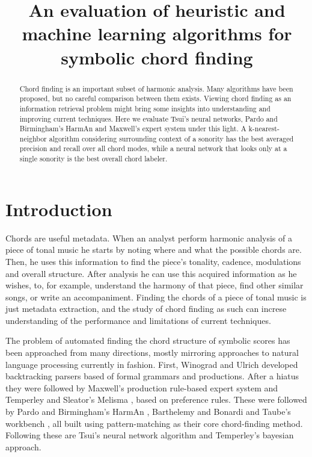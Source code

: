 \documentclass{article}
\title{An evaluation of heuristic and machine learning algorithms for
  symbolic chord finding} \oneauthor {}{}
\newcommand{\comment}[1]{}
\begin{document}
\graphicspath{{figs/}{data/}}
\maketitle

\begin{abstract}
Chord finding is an important subset of harmonic analysis. Many
algorithms have been proposed, but no careful comparison between them
exists. Viewing chord finding as an information retrieval problem
might bring some insights into understanding and improving current
techniques. Here we evaluate Tsui's neural networks, Pardo and
Birmingham's HarmAn and Maxwell's expert system under this light. A
k-nearest-neighbor algorithm considering surrounding context of a
sonority has the best averaged precision and recall over all chord
modes, while a neural network that looks only at a single sonority
is the best overall chord labeler.
\end{abstract}

\section{Introduction}
\label{sec:introduction}

\comment{
  ==> chord finding é importante, vários algoritmos propostos, poucas
  comparações 
  ==> revisar algoritmos
  ==> descrever artigo
}

Chords are useful metadata. When an analyst perform harmonic analysis
of a piece of tonal music he starts by noting where and what the
possible chords are. Then, he uses this information to find the
piece's tonality, cadence, modulations and overall structure. After
analysis he can use this acquired information as he wishes, to, for
example, understand the harmony of that piece, find other similar
songs, or write an accompaniment. Finding the chords of a piece of
tonal music is just metadata extraction, and the study of chord
finding as such can increse understanding of the performance and
limitations of current techniques.

The problem of automated finding the chord structure of symbolic
scores has been approached from many directions, mostly mirroring
approaches to natural language processing currently in fashion.
First, Winograd \cite{winograd:linguistics} and Ulrich
\cite{ulrich:analysis} developed backtracking parsers based of formal
grammars and productions. After a hiatus they were followed by
Maxwell's \cite{maxwell:expert} production rule-based expert system
and Temperley and Sleator's Melisma \cite{temperley.ea:modeling},
based on preference rules. These were followed by Pardo and
Birmingham's HarmAn \cite{pardo.ea:automated}, Barthelemy and Bonardi
\cite{barthelemy.ea:figured} and Taube's workbench
\cite{taube:automatic}, all built using pattern-matching as their core
chord-finding method. Following these are Tsui's \cite{tsui:harmonic}
neural network algorithm and Temperley's \cite{temperley:bayesian}
bayesian approach.
\end{document}
